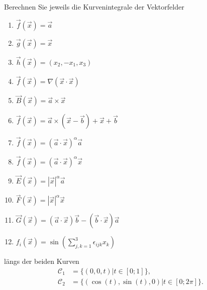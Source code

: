 
Berechnen Sie jeweils die Kurvenintegrale der Vektorfelder
\\
\parbox{0.5\textwidth}{\begin{enumerate}
\item $\vec{f}(\vec{x})=\vec{a}$
\item $\vec{g}(\vec{x})=\vec{x}$
\item $\vec{h}(\vec{x})=(x_2,-x_1,x_3)$
\item $\vec{f}(\vec{x})=\nabla(\vec{x}\cdot\vec{x})$
\item $\vec{B}(\vec{x})=\vec{a}\times\vec{x}$
\item $\vec{f}(\vec{x})=\vec{a}\times(\vec{x}-\vec{b})+\vec{x}+\vec{b}$
\end{enumerate}}\parbox{0.5\textwidth}{\begin{enumerate}\setcounter{enumi}{6}
\item $\vec{f}(\vec{x})=(\vec{a}\cdot\vec{x})^\alpha\vec{a}$
\item $\vec{f}(\vec{x})=(\vec{a}\cdot\vec{x})^\alpha\vec{x}$
\item $\vec{E}(\vec{x})=|\vec{x}|^\alpha\vec{a}$
\item $\vec{F}(\vec{x})=|\vec{x}|^\alpha\vec{x}$
\item $\vec{G}(\vec{x})=(\vec{a}\cdot\vec{x})\vec{b}-(\vec{b}\cdot\vec{x})\vec{a}$
\item $f_i(\vec{x})=\sin\left(\sum_{j,k=1}^3\epsilon_{ijk}x_k\right)$
\end{enumerate}}
längs der beiden Kurven
\begin{align*}
\mathcal{C}_1 &= \{(0,0,t)|t\in[0;1]\}, \\
\mathcal{C}_2 &= \{(\cos (t),\sin(t),0)|t\in[0;2\pi]\}.
\end{align*}



